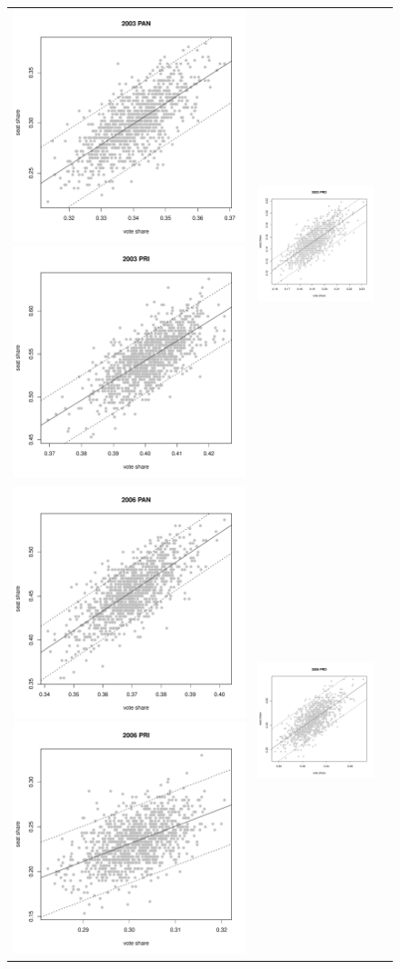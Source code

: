 \documentclass[letter,12pt]{article}
\begin{document}
\begin{figure}
\centering 
  \begin{tabular}{ccc}
  \includegraphics[width=.25\columnwidth]{../graphs/appendixPlots/95ciSwR-20032.pdf} 
  \includegraphics[width=.25\columnwidth]{../graphs/appendixPlots/95ciSwR-20031.pdf} &
  \includegraphics[width=.25\columnwidth]{../graphs/appendixPlots/95ciSwR-20033.pdf} \\
  \includegraphics[width=.25\columnwidth]{../graphs/appendixPlots/95ciSwR-20062.pdf} 
  \includegraphics[width=.25\columnwidth]{../graphs/appendixPlots/95ciSwR-20061.pdf} &
  \includegraphics[width=.25\columnwidth]{../graphs/appendixPlots/95ciSwR-20063.pdf} \\

\end{tabular}
\end{figure}
\end{document}
